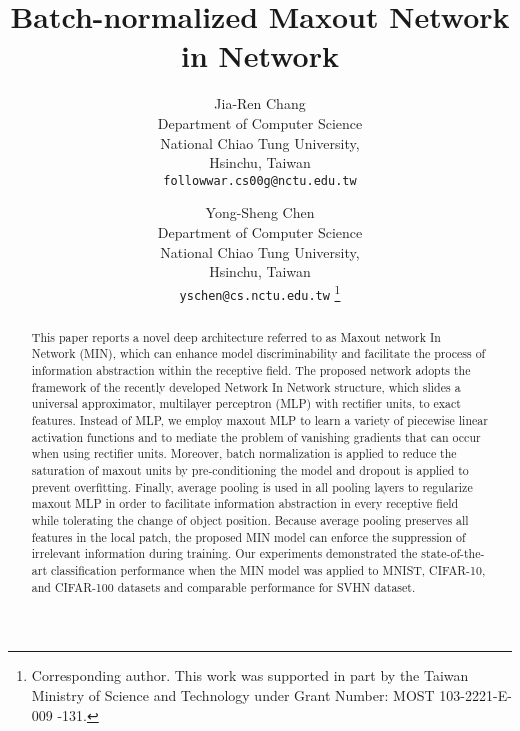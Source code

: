 \documentclass[10pt,twocolumn,letterpaper]{article}
\begin{document}
\title{Batch-normalized Maxout Network in Network}

\author{Jia-Ren Chang\\
Department of Computer Science\\
National Chiao Tung University, \\Hsinchu, Taiwan\\
{\tt\small followwar.cs00g@nctu.edu.tw}
\and
Yong-Sheng Chen\\
Department of Computer Science\\
National Chiao Tung University, \\Hsinchu, Taiwan\\
{\tt\small yschen@cs.nctu.edu.tw}
\thanks{Corresponding author. This work was supported in part by the Taiwan Ministry of Science and Technology under Grant Number: MOST 103-2221-E-009 -131.}
}

\maketitle


\begin{abstract}
This paper reports a novel deep architecture referred to as Maxout network In Network (MIN), which can enhance model discriminability and facilitate the process of information abstraction within the receptive field. The proposed network adopts the framework of the recently developed Network In Network structure, which slides a universal approximator, multilayer perceptron (MLP) with rectifier units, to exact features. Instead of MLP, we employ maxout MLP to learn a variety of piecewise linear activation functions and to mediate the problem of vanishing gradients that can occur when using rectifier units. Moreover, batch normalization is applied to reduce the saturation of maxout units by pre-conditioning the model and dropout is applied to prevent overfitting. Finally, average pooling is used in all pooling layers to regularize maxout MLP in order to facilitate information abstraction in every receptive field while tolerating the change of object position. Because average pooling preserves all features in the local patch, the proposed MIN model can enforce the suppression of irrelevant information during training. Our experiments demonstrated the state-of-the-art classification performance when the MIN model was applied to MNIST, CIFAR-10, and CIFAR-100 datasets and comparable performance for SVHN dataset.
\end{abstract}
\end{document}
